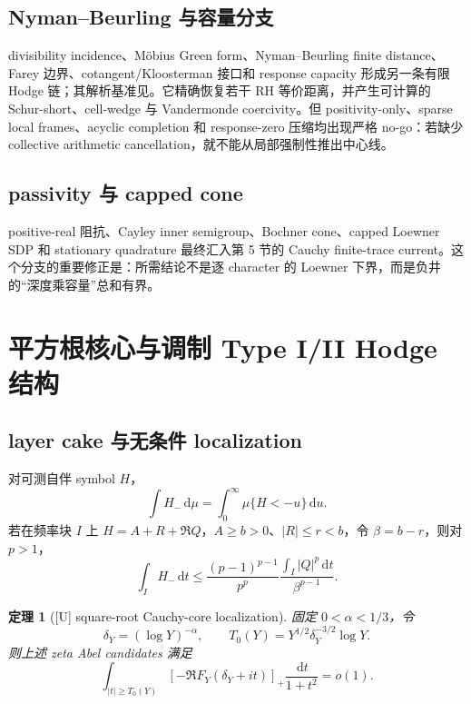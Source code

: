 \documentclass[UTF8,11pt,a4paper]{ctexart}
\newtheorem{theorem}{定理}[section]
\theoremstyle{definition}
\theoremstyle{remark}
\newcommand{\dd}{\,\mathrm d}
\newcommand{\1}{\mathbf 1}
\newcommand{\statusU}{\textnormal{[U]}}
\begin{document}
\subsection{Nyman--Beurling 与容量分支}

divisibility incidence、M\"obius Green form、Nyman--Beurling finite distance、Farey 边界、cotangent/Kloosterman 接口和 response capacity 形成另一条有限 Hodge 链；其解析基准见\cite{NymanBeurling,BaezDuarte,Burnol}。它精确恢复若干 RH 等价距离，并产生可计算的 Schur-short、cell-wedge 与 Vandermonde coercivity。但 positivity-only、sparse local frames、acyclic completion 和 response-zero 压缩均出现严格 no-go：若缺少 collective arithmetic cancellation，就不能从局部强制性推出中心线。

\subsection{passivity 与 capped cone}

positive-real 阻抗、Cayley inner semigroup、Bochner cone、capped Loewner SDP 和 stationary quadrature 最终汇入第 5 节的 Cauchy finite-trace current。这个分支的重要修正是：所需结论不是逐 character 的 Loewner 下界，而是负井的“深度乘容量”总和有界。

\section{平方根核心与调制 Type I/II Hodge 结构}

\subsection{layer cake 与无条件 localization}

对可测自伴 symbol $H$，
\[
  \int H_-\dd\mu=\int_0^\infty\mu\{H<-u\}\dd u.
\]
若在频率块 $I$ 上
$H=A+R+\Re Q$，$A\geq b>0$、$|R|\leq r<b$，令 $\beta=b-r$，则对 $p>1$，
\[
  \int_IH_-\dd t
  \leq \frac{(p-1)^{p-1}}{p^p}\frac{\int_I|Q|^p\dd t}{\beta^{p-1}}.
\]
\begin{theorem}[\statusU{} square-root Cauchy-core localization]\label{thm:sqrtcore}
固定 $0<\alpha<1/3$，令
\[
 \delta_Y=(\log Y)^{-\alpha},\qquad
 T_0(Y)=Y^{1/2}\delta_Y^{-3/2}\log Y.
\]
则上述 zeta Abel candidates 满足
\[
 \int_{|t|\geq T_0(Y)}[-\Re F_Y(\delta_Y+it)]_+
 \frac{\dd t}{1+t^2}=o(1).
\]
\end{theorem}
\end{document}
